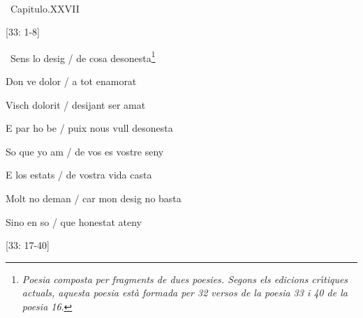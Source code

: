 \documentclass[12pt]{article}
\renewcommand{\espaiAbansEtiquetaPoema}{\vspace{0ex}}
\begin{document}
\begin{estrofa}

\espaiAbansEtiquetaPoema

\\

\begin{rubrica}

\pagina{[45v]} \textparagraph\  Capitulo.XXVII

\end{rubrica}

\begin{Versos}

[33: 1-8]

\end{Versos}

\end{estrofa}


\begin{estrofa}

 \textparagraph\  Sens lo desig / de cosa desonesta\footnote{\textit{Poesia
composta per fragments de dues poesies. Segons els edicions cr\'{\i}tiques
actuals, aquesta poesia est\`{a} formada per 32 versos de la poesia 33 i 40 de la
poesia 16}.}

 Don ve dolor / a tot enamorat

 Visch dolorit / desijant ser amat

 E par ho be / puix nous vull desonesta

 So que yo am / de vos es vostre seny

 E los estats / de vostra vida casta

 Molt no deman / car mon desig no basta

 Sino en so / que honestat ateny

\end{estrofa}





\begin{estrofaBuida}


\end{estrofaBuida}


\begin{estrofaExtra}%




\begin{Versos}

[33: 17-40]

\end{Versos}


\end{estrofaExtra}
\end{document}
